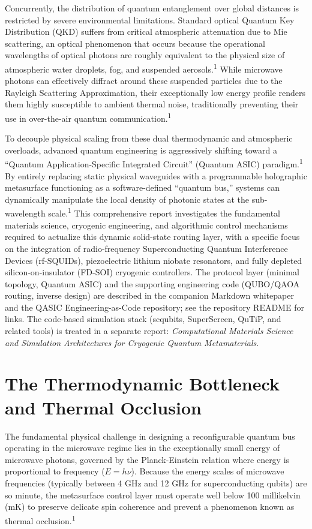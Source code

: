 \documentclass[11pt, a4paper]{article}
\begin{document}
Concurrently, the distribution of quantum entanglement over global distances is restricted by severe environmental limitations. Standard optical Quantum Key Distribution (QKD) suffers from critical atmospheric attenuation due to Mie scattering, an optical phenomenon that occurs because the operational wavelengths of optical photons are roughly equivalent to the physical size of atmospheric water droplets, fog, and suspended aerosols.\textsuperscript{1} While microwave photons can effectively diffract around these suspended particles due to the Rayleigh Scattering Approximation, their exceptionally low energy profile renders them highly susceptible to ambient thermal noise, traditionally preventing their use in over-the-air quantum communication.\textsuperscript{1}

To decouple physical scaling from these dual thermodynamic and atmospheric overloads, advanced quantum engineering is aggressively shifting toward a ``Quantum Application-Specific Integrated Circuit'' (Quantum ASIC) paradigm.\textsuperscript{1} By entirely replacing static physical waveguides with a programmable holographic metasurface functioning as a software-defined ``quantum bus,'' systems can dynamically manipulate the local density of photonic states at the sub-wavelength scale.\textsuperscript{1} This comprehensive report investigates the fundamental materials science, cryogenic engineering, and algorithmic control mechanisms required to actualize this dynamic solid-state routing layer, with a specific focus on the integration of radio-frequency Superconducting Quantum Interference Devices (rf-SQUIDs), piezoelectric lithium niobate resonators, and fully depleted silicon-on-insulator (FD-SOI) cryogenic controllers. The protocol layer (minimal topology, Quantum ASIC) and the supporting engineering code (QUBO/QAOA routing, inverse design) are described in the companion Markdown whitepaper and the QASIC Engineering-as-Code repository; see the repository README for links. The code-based simulation stack (scqubits, SuperScreen, QuTiP, and related tools) is treated in a separate report: \textit{Computational Materials Science and Simulation Architectures for Cryogenic Quantum Metamaterials}.

\section*{The Thermodynamic Bottleneck and Thermal Occlusion}

The fundamental physical challenge in designing a reconfigurable quantum bus operating in the microwave regime lies in the exceptionally small energy of microwave photons, governed by the Planck-Einstein relation where energy is proportional to frequency ($E = h\nu$). Because the energy scales of microwave frequencies (typically between 4 GHz and 12 GHz for superconducting qubits) are so minute, the metasurface control layer must operate well below 100 millikelvin (mK) to preserve delicate spin coherence and prevent a phenomenon known as thermal occlusion.\textsuperscript{1}
\end{document}
